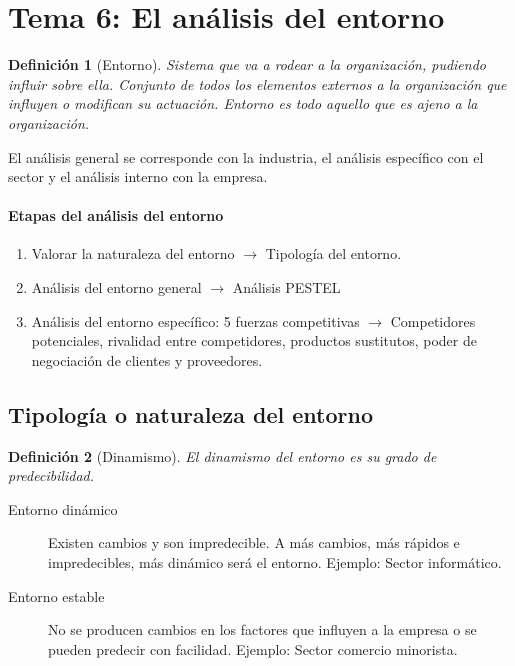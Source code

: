 \documentclass[12pt]{article}
\theoremstyle{definition_wo_parentheses}
\newtheorem{definicion}{Definición}[section]
\begin{document}
\section{Tema 6: El análisis del entorno}

\begin{definicion}[Entorno]
	Sistema que va a rodear a la organización, pudiendo influir sobre ella. Conjunto de todos los elementos externos a la organización que influyen o modifican su actuación. Entorno es todo aquello que es ajeno a la organización.
\end{definicion}

	El análisis general se corresponde con la industria, el análisis específico con el sector y el análisis interno con la empresa.

\paragraph{Etapas del análisis del entorno}
\begin{enumerate}
\item Valorar la naturaleza del entorno $\rightarrow$ Tipología del entorno.
\item Análisis del entorno general $\rightarrow$ Análisis PESTEL
\item Análisis del entorno específico: 5 fuerzas competitivas $\rightarrow$ Competidores potenciales, rivalidad entre competidores, productos sustitutos, poder de negociación de clientes y proveedores.
\end{enumerate}

\subsection{Tipología  o naturaleza del entorno}

\begin{definicion}[Dinamismo]
El dinamismo del entorno es su grado de predecibilidad.
\end{definicion}

\begin{description}
\item[Entorno dinámico] Existen cambios y son impredecible. A más cambios, más rápidos e impredecibles, más dinámico será el entorno. Ejemplo: Sector informático.
\item[Entorno estable] No se producen cambios en los factores que influyen a la empresa o se pueden predecir con facilidad. Ejemplo: Sector comercio minorista.
\end{description}
\end{document}
